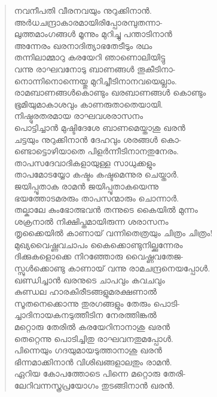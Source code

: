 \begin{verse}
നവനീപതി വീരനവയും നുറുക്കിനാന്‍.\\
അര്‍ധചന്ദ്രാകാരമായിരിപ്പോരമ്പുതന്നാ-\\
ലുത്തമാംഗങ്ങള്‍ മൂന്നും മുറിച്ചു പന്താടിനാന്‍\\
അന്നേരം ഖരനാദിത്യാഭതേടീടും രഥം\\
തന്നിലാമ്മാറു കരയേറി ഞാണൊലിയിട്ടു\\
വന്നു രാഘവനോടു ബാണങ്ങള്‍ തൂകീടിനാ-\\
നൊന്നിനൊന്നെയ്തു മുറിച്ചീടിനാനവയെല്ലാം.\\
രാമബാണങ്ങള്‍കൊണ്ടും ഖരബാണങ്ങള്‍ കൊണ്ടും\\
ഭൂമിയുമാകാശവും കാണരുതാതെയായി.\\
നിഷ്ഠുരതരമായ രാഘവശരാസനം\\
പൊട്ടിച്ചാന്‍ മുഷ്ടിദേശേ ബാണമെയ്താശു ഖരന്‍\\
ചട്ടയും നുറുക്കിനാന്‍ ദേഹവും ശരങ്ങള്‍ കൊ-\\
ണ്ടൊട്ടൊഴിയാതെ പിളര്‍ന്നീടിനാനതുനേരം.\\
താപസദേവാദികളായുള്ള സാധുക്കളും\\
താപമോടയ്യോ കഷ്ടം കഷ്ടമെന്നുര ചെയ്താര്‍.\\
ജയിപ്പൂതാക രാമന്‍ ജയിപ്പൂതാകയെന്നു\\
ഭയത്തോടമരരും താപസന്മാരും ചൊന്നാര്‍.\\
തല്കാലേ കുംഭോത്ഭവന്‍ തന്നുടെ കൈയില്‍ മുന്നം\\
ശക്രനാല്‍ നിക്ഷിപ്തമായിരുന്ന ശരാസനം\\
തൃക്കൈയില്‍ കാണായ് വന്നിതെത്രയും ചിത്രം \hbox{ചിത്രം!}\\
മുഖ്യവൈഷ്ണവചാപം കൈക്കൊണ്ടുനില്ക്കുന്നേരം\\
ദിക്കുകളൊക്കെ നിറഞ്ഞോരു വൈഷ്ണവതേജ-\\
സ്സുള്‍ക്കൊണ്ടു കാണായ് വന്നു രാമചന്ദ്രനെയപ്പോള്‍.\\
ഖണ്ഡിച്ചാന്‍ ഖരനുടെ ചാപവും കവചവും\\
കുണ്ഡല ഹാരകിരീടങ്ങളുമരക്ഷണാല്‍\\
സൂതനെക്കൊന്നു തുരഗങ്ങളും തേരും പൊടി-\\
ച്ചാദിനായകനടുത്തീടിന നേരത്തിങ്കല്‍\\
മറ്റൊരു തേരില്‍ കരയേറിനാനാശു ഖരന്‍\\
തെറ്റെന്നു പൊടിച്ചിതു രാഘവനതുമപ്പോള്‍.\\
പിന്നെയും ഗദയുമായടുത്താനാശു ഖരന്‍\\
ഭിന്നമാക്കിനാന്‍ വിശിഖങ്ങളാലതും രാമന്‍.\\
ഏറിയ കോപത്തോടെ പിന്നെ മറ്റൊരു തേരി-\\
ലേറിവന്നസ്ത്രപ്രയോഗം തുടങ്ങിനാന്‍ ഖരന്‍.\\

\end{verse}
